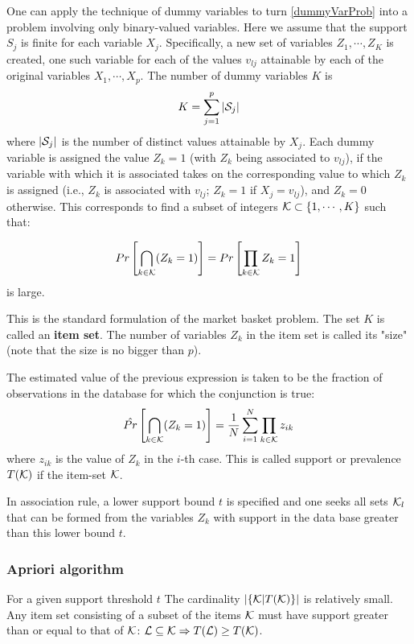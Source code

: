 \documentclass[12pt, letterpaper]{article}
\theoremstyle{definition}
\DeclarePairedDelimiter\autobracket{(}{)}
\newcommand{\br}[1]{\autobracket*{#1}}
\begin{document}
One can apply the technique of dummy variables to turn \ref{dummyVarProb} into a problem involving only binary-valued variables. Here we assume that the support $S_j$ is finite for each variable $X_j$. Specifically, a new set of variables $Z_1, \cdots, Z_K$ is created, one such variable for each of the values $v_{lj}$ attainable by each of the original variables $X_1, \cdots, X_p$. The number of dummy variables $K$ is
\begin{equation}
K = \sum_{j=1}^p |\CMcal{S}_j|
\end{equation}
where $|\CMcal{S}_j|$ is the number of distinct values attainable by $X_j$.  Each dummy variable is assigned the value $Z_k = 1$ (with $Z_k$ being associated to $v_{lj}$), if the variable with which it is associated takes on the corresponding value to which $Z_k$ is assigned (i.e., $Z_k$ is associated with $v_{lj}$; $Z_k = 1$ if  $X_j=v_{lj}$), and $Z_k = 0$ otherwise. This corresponds to find a subset of integers $\CMcal{K} \subset \{1,\cdots, K\}$ such that:

\begin{equation}
Pr\left[ \bigcap\limits_{k \in \CMcal{K}} \br{Z_k = 1}\right] = Pr\left[ \prod_{k \in \CMcal{K}} Z_k = 1\right]
\end{equation}
is large.

This is the standard formulation of the market basket problem. The set $K$ is called an \textbf{item set}. The number of variables $Z_k$ in the item set is called its "size" (note that the size is no bigger than $p$).

The estimated value of the previous expression is taken to be the fraction of observations in the database for which the conjunction is true:
\begin{equation}
\hat{Pr}\left[ \bigcap\limits_{k \in \CMcal{K}} \br{Z_k = 1}\right] = \frac{1}{N}\sum_{i=1}^N \prod_{k \in \CMcal{K}} z_{ik}
\end{equation}
where $z_{ik}$ is the value of $Z_k$ in the $i$-th case. This is called support or prevalence $T(\CMcal{K})$ if the item-set $\CMcal{K}$.

In association rule, a lower support bound $t$ is specified and one seeks all sets $\CMcal{K}_l$ that can be formed from the variables $Z_k$ with support in the data base greater than this lower bound $t$.

\subsubsection{Apriori algorithm}
For a given support threshold $t$ The cardinality $|\{\CMcal{K}| T(\CMcal{K}) \}|$ is relatively small. Any item set consisting of a subset of the items $\CMcal{K}$ must have support greater than or equal to that of  $\CMcal{K}$:  $\CMcal{L} \subseteq \CMcal{K} \Rightarrow T(\CMcal{L})\ge T(\CMcal{K})$.
\end{document}
